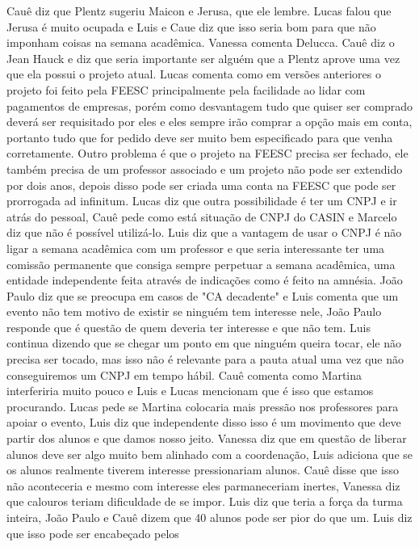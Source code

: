 \documentclass{ata-calico}
\begin{document}
 Cauê diz que Plentz sugeriu
Maicon e Jerusa, que ele lembre. Lucas falou que Jerusa é muito ocupada e Luis
e Caue diz que isso seria bom para que não imponham coisas na semana acadêmica.
Vanessa comenta Delucca. Cauê diz o Jean Hauck e diz que seria importante ser
alguém que a Plentz aprove uma vez que ela possui o projeto atual. Lucas
comenta como em versões anteriores o projeto foi feito pela FEESC
principalmente pela facilidade ao lidar com pagamentos de empresas, porém como
desvantagem tudo que quiser ser comprado deverá ser requisitado por eles e eles
sempre irão comprar a opção mais em conta, portanto tudo que for pedido deve
ser muito bem especificado para que venha corretamente. Outro problema é que o
projeto na FEESC precisa ser fechado, ele também precisa de um professor
associado e um projeto não pode ser extendido por dois anos, depois disso pode
ser criada uma conta na FEESC que pode ser prorrogada ad infinitum. Lucas diz
que outra possibilidade é ter um CNPJ e ir atrás do pessoal, Cauê pede como
está situação de CNPJ do CASIN e Marcelo diz que não é possível utilizá-lo.
Luis diz que a vantagem de usar o CNPJ é não ligar a semana acadêmica com um
professor e que seria interessante ter uma comissão permanente que consiga
sempre perpetuar a semana acadêmica, uma entidade independente feita através de
indicações como é feito na amnésia. João Paulo diz que se preocupa em casos de
"CA decadente" e Luis comenta que um evento não tem motivo de existir se
ninguém tem interesse nele, João Paulo responde que é questão de quem deveria
ter interesse e que não tem. Luis continua dizendo que se chegar um ponto em
que ninguém queira tocar, ele não precisa ser tocado, mas isso não é relevante
para a pauta atual uma vez que não conseguiremos um CNPJ em tempo hábil. Cauê
comenta como Martina interferiria muito pouco e Luis e Lucas mencionam que é
isso que estamos procurando. Lucas pede se Martina colocaria mais pressão nos
professores para apoiar o evento, Luis diz que independente disso isso é um
movimento que deve partir dos alunos e que damos nosso jeito. Vanessa diz que
em questão de liberar alunos deve ser algo muito bem alinhado com a
coordenação, Luis adiciona que se os alunos realmente tiverem interesse
pressionariam alunos. Cauê disse que isso não aconteceria e mesmo com interesse
eles parmaneceriam inertes, Vanessa diz que calouros teriam dificuldade de se
impor. Luis diz que teria a força da turma inteira, João Paulo e Cauê dizem que
40 alunos pode ser pior do que um. Luis diz que isso pode ser encabeçado pelos
\end{document}
